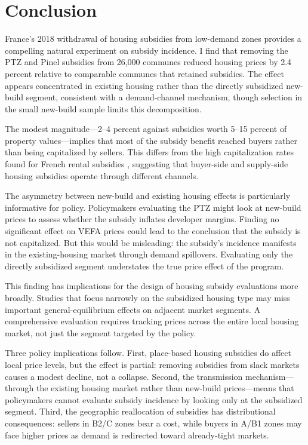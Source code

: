\documentclass[12pt]{article}
\begin{document}
\section{Conclusion}

France's 2018 withdrawal of housing subsidies from low-demand zones provides a compelling natural experiment on subsidy incidence. I find that removing the PTZ and Pinel subsidies from 26,000 communes reduced housing prices by 2.4 percent relative to comparable communes that retained subsidies. The effect appears concentrated in existing housing rather than the directly subsidized new-build segment, consistent with a demand-channel mechanism, though selection in the small new-build sample limits this decomposition.

The modest magnitude---2--4 percent against subsidies worth 5--15 percent of property values---implies that most of the subsidy benefit reached buyers rather than being capitalized by sellers. This differs from the high capitalization rates found for French rental subsidies \citep{fack2006}, suggesting that buyer-side and supply-side housing subsidies operate through different channels.

The asymmetry between new-build and existing housing effects is particularly informative for policy. Policymakers evaluating the PTZ might look at new-build prices to assess whether the subsidy inflates developer margins. Finding no significant effect on VEFA prices could lead to the conclusion that the subsidy is not capitalized. But this would be misleading: the subsidy's incidence manifests in the existing-housing market through demand spillovers. Evaluating only the directly subsidized segment understates the true price effect of the program.

This finding has implications for the design of housing subsidy evaluations more broadly. Studies that focus narrowly on the subsidized housing type \citep{eriksen2017, baum2010} may miss important general-equilibrium effects on adjacent market segments. A comprehensive evaluation requires tracking prices across the entire local housing market, not just the segment targeted by the policy.

Three policy implications follow. First, place-based housing subsidies do affect local price levels, but the effect is partial: removing subsidies from slack markets causes a modest decline, not a collapse. Second, the transmission mechanism---through the existing housing market rather than new-build prices---means that policymakers cannot evaluate subsidy incidence by looking only at the subsidized segment. Third, the geographic reallocation of subsidies has distributional consequences: sellers in B2/C zones bear a cost, while buyers in A/B1 zones may face higher prices as demand is redirected toward already-tight markets.
\end{document}
